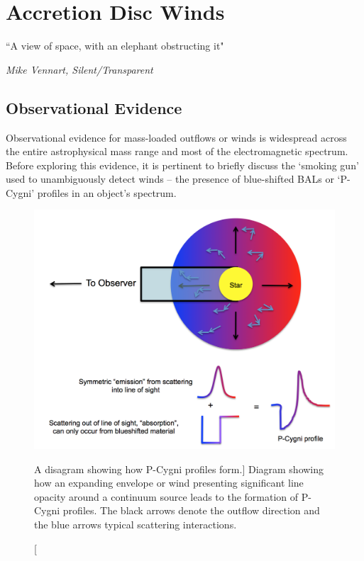  \chapter{Accretion Disc Winds}
\label{sec:winds}

\epigraph{``A view of space, with an elephant obstructing it"}
{{\sl Mike Vennart, Silent/Transparent}}


\section{Observational Evidence}

Observational evidence for mass-loaded outflows or winds is 
widespread across the entire astrophysical mass range and most of
the electromagnetic spectrum. Before exploring this evidence, 
it is pertinent to briefly discuss the `smoking gun'
used to unambiguously detect winds -- the presence of blue-shifted BALs
or `P-Cygni' profiles in an object's spectrum. 

\begin{figure}
\centering
\includegraphics[width=1.0\textwidth]{figures/02-outflows/pcyg.png}
\caption
[A disagram showing how P-Cygni profiles form.]
{
Diagram showing how an expanding envelope or wind presenting significant line
opacity around a continuum source leads to the formation of P-Cygni profiles.
The black arrows denote the outflow direction and the blue arrows typical
scattering interactions.
} 
\label{fig:pcyg}
\end{figure}

